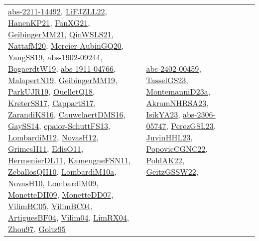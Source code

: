 {\begin{longtable}{lp{3cm}>{\raggedright}p{6cm}>{\raggedright}p{6cm}p{8cm}}
\href{articles/abs-2211-14492.pdf}{abs-2211-14492}\cite{abs-2211-14492}, \href{papers/LiFJZLL22.pdf}{LiFJZLL22}\cite{LiFJZLL22}, \href{papers/HanenKP21.pdf}{HanenKP21}\cite{HanenKP21}, \href{articles/FanXG21.pdf}{FanXG21}\cite{FanXG21}, \href{papers/GeibingerMM21.pdf}{GeibingerMM21}\cite{GeibingerMM21}, \href{articles/QinWSLS21.pdf}{QinWSLS21}\cite{QinWSLS21}, \href{papers/NattafM20.pdf}{NattafM20}\cite{NattafM20}, \href{papers/Mercier-AubinGQ20.pdf}{Mercier-AubinGQ20}\cite{Mercier-AubinGQ20}, \href{papers/YangSS19.pdf}{YangSS19}\cite{YangSS19}, \href{articles/abs-1902-09244.pdf}{abs-1902-09244}\cite{abs-1902-09244}, \href{papers/BogaerdtW19.pdf}{BogaerdtW19}\cite{BogaerdtW19}, \href{articles/abs-1911-04766.pdf}{abs-1911-04766}\cite{abs-1911-04766}, \href{papers/MalapertN19.pdf}{MalapertN19}\cite{MalapertN19}, \href{papers/GeibingerMM19.pdf}{GeibingerMM19}\cite{GeibingerMM19}, \href{papers/ParkUJR19.pdf}{ParkUJR19}\cite{ParkUJR19}, \href{papers/OuelletQ18.pdf}{OuelletQ18}\cite{OuelletQ18}, \href{articles/KreterSS17.pdf}{KreterSS17}\cite{KreterSS17}, \href{papers/CappartS17.pdf}{CappartS17}\cite{CappartS17}, \href{articles/ZarandiKS16.pdf}{ZarandiKS16}\cite{ZarandiKS16}, \href{papers/CauwelaertDMS16.pdf}{CauwelaertDMS16}\cite{CauwelaertDMS16}, \href{papers/GaySS14.pdf}{GaySS14}\cite{GaySS14}, \href{papers/cpaior-SchuttFS13.pdf}{cpaior-SchuttFS13}\cite{cpaior-SchuttFS13}, \href{articles/LombardiM12.pdf}{LombardiM12}\cite{LombardiM12}, \href{articles/NovasH12.pdf}{NovasH12}\cite{NovasH12}, \href{papers/GrimesH11.pdf}{GrimesH11}\cite{GrimesH11}, \href{papers/EdisO11.pdf}{EdisO11}\cite{EdisO11}, \href{papers/HermenierDL11.pdf}{HermenierDL11}\cite{HermenierDL11}, \href{papers/KameugneFSN11.pdf}{KameugneFSN11}\cite{KameugneFSN11}, \href{articles/ZeballosQH10.pdf}{ZeballosQH10}\cite{ZeballosQH10}, \href{articles/LombardiM10a.pdf}{LombardiM10a}\cite{LombardiM10a}, \href{articles/NovasH10.pdf}{NovasH10}\cite{NovasH10}, \href{papers/LombardiM09.pdf}{LombardiM09}\cite{LombardiM09}, \href{papers/MonetteDH09.pdf}{MonetteDH09}\cite{MonetteDH09}, \href{papers/MonetteDD07.pdf}{MonetteDD07}\cite{MonetteDD07}, \href{articles/VilimBC05.pdf}{VilimBC05}\cite{VilimBC05}, \href{papers/VilimBC04.pdf}{VilimBC04}\cite{VilimBC04}, \href{papers/ArtiguesBF04.pdf}{ArtiguesBF04}\cite{ArtiguesBF04}, \href{papers/Vilim04.pdf}{Vilim04}\cite{Vilim04}, \href{papers/LimRX04.pdf}{LimRX04}\cite{LimRX04}, \href{articles/Zhou97.pdf}{Zhou97}\cite{Zhou97}, \href{papers/Goltz95.pdf}{Goltz95}\cite{Goltz95} & \href{articles/abs-2402-00459.pdf}{abs-2402-00459}\cite{abs-2402-00459}, \href{papers/TasselGS23.pdf}{TasselGS23}\cite{TasselGS23}, \href{articles/MontemanniD23a.pdf}{MontemanniD23a}\cite{MontemanniD23a}, \href{articles/AkramNHRSA23.pdf}{AkramNHRSA23}\cite{AkramNHRSA23}, \href{articles/IsikYA23.pdf}{IsikYA23}\cite{IsikYA23}, \href{articles/abs-2306-05747.pdf}{abs-2306-05747}\cite{abs-2306-05747}, \href{papers/PerezGSL23.pdf}{PerezGSL23}\cite{PerezGSL23}, \href{papers/JuvinHHL23.pdf}{JuvinHHL23}\cite{JuvinHHL23}, \href{papers/PopovicCGNC22.pdf}{PopovicCGNC22}\cite{PopovicCGNC22}, \href{articles/PohlAK22.pdf}{PohlAK22}\cite{PohlAK22}, \href{papers/GeitzGSSW22.pdf}{GeitzGSSW22}\cite{GeitzGSSW22}, 
\end{longtable}}
